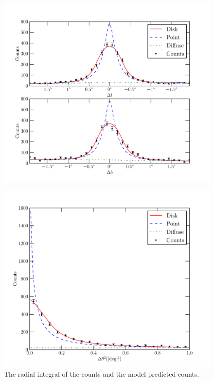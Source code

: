 \documentclass[12pt,preprint]{aastex}
\begin{document}
\clearpage
\begin{figure}
  \begin{center}
    \includegraphics{ic443_plots/ic443_counts_slice.pdf}
    \caption{
    }
    \label{counts_slice}
  \end{center}
\end{figure}

\clearpage
\begin{figure}
  \begin{center}
    \includegraphics{ic443_plots/ic443_radial_integral.pdf}
    \caption{The radial integral of the counts and the model predicted counts.
    }
    \label{radial_profile}
  \end{center}
\end{figure}
\end{document}
